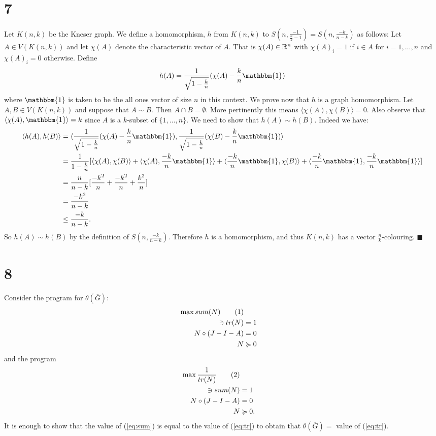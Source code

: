\documentclass[letterpaper,12pt,oneside,onecolumn]{article}
\newcommand{\1}{\mathbbm{1}}
\newcommand\numberthis{\addtocounter{equation}{1}\tag{\theequation}}
\begin{document}
\section*{7}
\paragraph{}
Let $K(n,k)$ be the Kneser graph. We define a homomorphism, $h$ from $K(n,k)$ to $S(n, \frac{-1}{\frac{n}{k}-1}) = S(n, \frac{-k}{n-k})$ as follows: Let $A \in V(K(n,k))$ and let $\chi(A)$ denote the characteristic vector of $A$. That is $\chi(A) \in \mathbb{R}^n$ with $\chi(A)_i = 1$ if $i \in A$ for $i =1,\dots, n$ and $\chi(A)_i = 0$ otherwise. Define
$$h(A) = \frac{1}{\sqrt{1 - \frac{k}{n}}} (\chi(A) - \frac{k}{n} \1)$$
where $\1$ is taken to be the all ones vector of size $n$ in this context. We prove now that $h$ is a graph homomorphism. Let $A,B \in V(K(n,k))$ and suppose that $A\sim B$. Then $A\cap B = \emptyset$. More pertinently this means $\langle \chi(A), \chi(B) \rangle = 0$. Also observe that $\langle \chi(A), \1\rangle = k$ since $A$ is a $k$-subset of $\{1, \dots, n\}$. We need to show that $h(A) \sim h(B)$. Indeed we have:
\begin{align*}
\langle h(A), h(B) \rangle &= \langle  \frac{1}{\sqrt{1 - \frac{k}{n}}} (\chi(A) - \frac{k}{n} \1),  \frac{1}{\sqrt{1 - \frac{k}{n}}} (\chi(B) - \frac{k}{n} \1) \rangle \\
&= \frac{1}{1-\frac{k}{n}}[\langle \chi(A), \chi(B)\rangle + \langle \chi(A), \frac{-k}{n}\1\rangle + \langle \frac{-k}{n} \1, \chi(B) \rangle + \langle \frac{-k}{n} \1, \frac{-k}{n} \1\rangle] \\
&= \frac{n}{n-k}[\frac{-k^2}{n} + \frac{-k^2}{n} + \frac{k^2}{n}] \\
&= \frac{-k^2}{n-k} \\
&\leq \frac{-k}{n-k}.
\end{align*}
So $h(A) \sim h(B)$ by the definition of $S(n, \frac{-k}{n-k})$. Therefore $h$ is a homomorphism, and thus $K(n,k)$ has a vector $\frac{n}{k}$-colouring. $\blacksquare$
\section*{8}
\paragraph{}
Consider the program for $\theta(\overline{G})$:
\begin{align*}
\max sum(N) \label{eq:sum}\numberthis  \\
\ni tr(N) &= 1\\
N \circ (J - I - A) & =0 \\
N & \succcurlyeq 0
\end{align*}
and the program
\begin{align*}
\max \frac{1}{tr(N)} \label{eq:tr}\numberthis  \\
\ni sum(N) &= 1\\
N \circ (J - I - A) & =0 \\
N & \succcurlyeq 0.
\end{align*}
It is enough to show that the value of (\ref{eq:sum}) is equal to the value of (\ref{eq:tr}) to obtain that $\theta(\overline{G}) = $ value of (\ref{eq:tr}).
\end{document}
